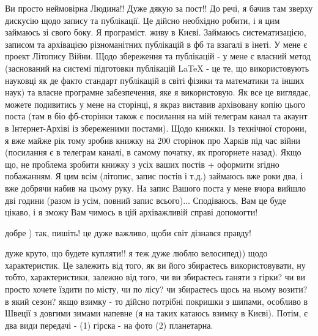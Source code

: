  
 
 
 
 

Ви просто неймовірна Людина!! Дуже дякую за пост!! До речі, я
бачив там зверху дискусію щодо запису та публікації. Це дійсно необхідно
робити, і я цим займаюсь зі свого боку. Я програміст. живу в Києві. Займаюсь
систематизацією, записом та архівацією різноманітних публікацій в фб та взагалі
в інеті. У мене є проект Літопису Війни. Щодо збереження та публікацій - у мене
є власний метод (заснований на системі підготовки публікацій LaTeX - це те, що
використовують науковці як де факто стандарт публікацій в світі фізики та
математики та інших наук) та власне програмне забезпечення, яке я використовую.
Як все це виглядає, можете подивитись у мене на сторінці, я якраз виставив
архівовану копію цього поста (там в біо фб-сторінки також є посилання на мій
телеграм канал та акаунт в Інтернет-Архіві із збереженими постами). Щодо
книжки. Із технічної сторони, я вже майже рік тому зробив книжку на 200
сторінок про Харків під час війни (посилання є в телеграм каналі, в самому
початку, як прогорнете назад). Якщо що, не проблема зробити книжку з усіх ваших
постів + оформити згідно побажанням. Я цим всім (літопис, запис постів і т.д.)
займаюсь вже роки два, і вже добрячи набив на цьому руку. На запис Вашого поста
у мене вчора вийшло дві години (разом із усім, повний запис всього)...
Сподіваюсь, Вам це буде цікаво, і я зможу Вам чимось в цій архіважливій справі
допомогти!

добре ) так, пишіть! це дуже важливо, щоби світ дізнався правду!

дуже круто, що будете купляти!! я теж дуже люблю велосипед)) щодо
характеристик. Це залежить від того, як ви його збираєтесь використовувати, ну
тобто, характеристики, залежно від того, чи ви збираєтесь ганяти з гірки? чи ви
просто хочете їздити по місту, чи по лісу? чи збираєтесь щось на ньому возити?
в який сезон? якщо взимку - то дійсно потрібні покришки з шипами, особливо в
Швеції з довгими зимами напевне (я на таких катаюсь взимку в Києві). Потім, є
два види передачі - (1) гірска - на фото (2) планетарна. 

